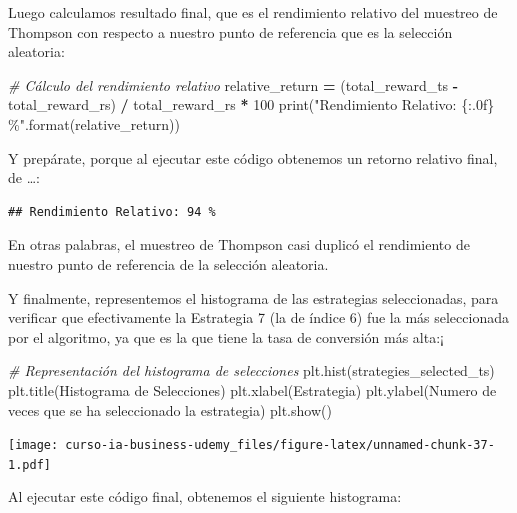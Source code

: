 \documentclass[
]{book}
\newenvironment{Shaded}{\begin{snugshade}}{\end{snugshade}}
\newcommand{\BuiltInTok}[1]{#1}
\newcommand{\CommentTok}[1]{\textcolor[rgb]{0.56,0.35,0.01}{\textit{#1}}}
\newcommand{\DecValTok}[1]{\textcolor[rgb]{0.00,0.00,0.81}{#1}}
\newcommand{\NormalTok}[1]{#1}
\newcommand{\OperatorTok}[1]{\textcolor[rgb]{0.81,0.36,0.00}{\textbf{#1}}}
\newcommand{\SpecialCharTok}[1]{\textcolor[rgb]{0.00,0.00,0.00}{#1}}
\newcommand{\StringTok}[1]{\textcolor[rgb]{0.31,0.60,0.02}{#1}}
\begin{document}
Luego calculamos resultado final, que es el rendimiento relativo del muestreo de Thompson con respecto a nuestro punto de referencia que es la selección aleatoria:

\begin{Shaded}
\begin{Highlighting}[]
\CommentTok{\# Cálculo del rendimiento relativo}
\NormalTok{relative\_return }\OperatorTok{=}\NormalTok{ (total\_reward\_ts }\OperatorTok{{-}}\NormalTok{ total\_reward\_rs) }\OperatorTok{/}\NormalTok{ total\_reward\_rs }\OperatorTok{*} \DecValTok{100}
\BuiltInTok{print}\NormalTok{(}\StringTok{"Rendimiento Relativo: }\SpecialCharTok{\{:.0f\}}\StringTok{ \%"}\NormalTok{.}\BuiltInTok{format}\NormalTok{(relative\_return))}
\end{Highlighting}
\end{Shaded}

Y prepárate, porque al ejecutar este código obtenemos un retorno relativo final, de \ldots:

\begin{verbatim}
## Rendimiento Relativo: 94 %
\end{verbatim}

En otras palabras, el muestreo de Thompson casi duplicó el rendimiento de nuestro punto de referencia de la selección aleatoria.

Y finalmente, representemos el histograma de las estrategias seleccionadas, para verificar que efectivamente la Estrategia 7 (la de índice 6) fue la más seleccionada por el algoritmo, ya que es la que tiene la tasa de conversión más alta:¡

\begin{Shaded}
\begin{Highlighting}[]
\CommentTok{\# Representación del histograma de selecciones}
\NormalTok{plt.hist(strategies\_selected\_ts)}
\NormalTok{plt.title(}\StringTok{\textquotesingle{}Histograma de Selecciones\textquotesingle{}}\NormalTok{)}
\NormalTok{plt.xlabel(}\StringTok{\textquotesingle{}Estrategia\textquotesingle{}}\NormalTok{)}
\NormalTok{plt.ylabel(}\StringTok{\textquotesingle{}Numero de veces que se ha seleccionado la estrategia\textquotesingle{}}\NormalTok{)}
\NormalTok{plt.show()}
\end{Highlighting}
\end{Shaded}

\texttt{[image: curso-ia-business-udemy\_files/figure-latex/unnamed-chunk-37-1.pdf]}

Al ejecutar este código final, obtenemos el siguiente histograma:
\end{document}
